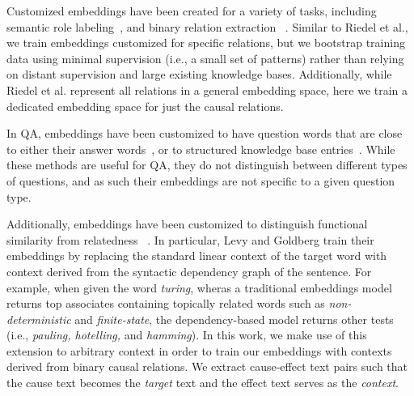 Customized embeddings have been created for a variety of tasks, including semantic role labeling~\cite{fitzgerald2015semantic,woodsenddistributed}, and binary relation extraction ~\mbox{\cite{riedel2013relation}.}
Similar to Riedel et al., we train embeddings customized for specific relations, but we bootstrap training data using minimal supervision (i.e., a small set of patterns) rather than relying on distant supervision and large existing knowledge bases.  Additionally, while Riedel et al. represent all relations in a general embedding space, here we train a dedicated embedding space for just the causal relations. 

In QA, embeddings have been customized to have question words that are close to either their answer words~\cite{bordes2014question}, or to structured knowledge base entries~\cite{yang2014joint}.  While these methods are useful for QA, they do not distinguish between different types of questions, and as such their embeddings are not specific to a given question type.

Additionally, embeddings have been customized to distinguish functional similarity from relatedness ~\cite{levy2014dependency,kielaspecializing}.
In particular, Levy and Goldberg train their embeddings by replacing the standard linear context of the target word with context derived from the syntactic dependency graph of the sentence.  For example, when given the word \emph{turing}, wheras a traditional embeddings model returns top associates containing topically related words such as \emph{non-deterministic} and \emph{finite-state}, the dependency-based model returns other tests (i.e., \emph{pauling, hotelling,} and \emph{hamming}).
In this work, we make use of this extension to arbitrary context in order to train our embeddings with contexts derived from binary causal relations.  We extract cause-effect text pairs such that the cause text becomes the \emph{target} text and the effect text serves as the \emph{context}. 

